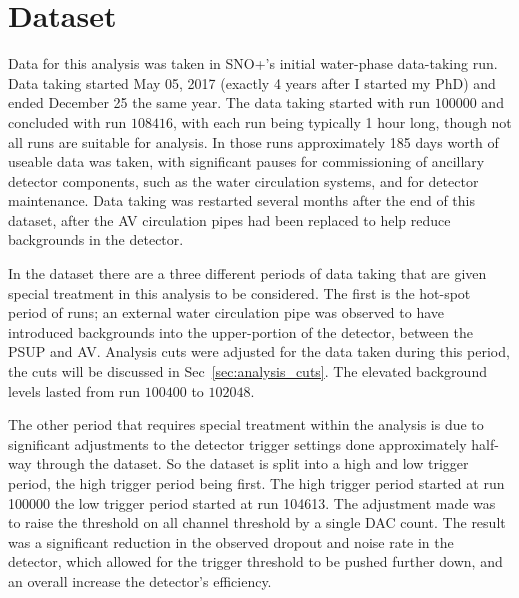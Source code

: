 \section{Dataset}
\label{sec:dataset}
Data for this analysis was taken in SNO+'s initial water-phase data-taking
run.
Data taking started May 05, 2017 (exactly 4 years after I
started my PhD) and ended December 25 the same year.
The data taking started with run $100000$ and concluded with run
$108416$, with each run being typically 1 hour long, though not
all runs are suitable for analysis.
In those runs approximately 185 days worth of useable data was taken,
with significant pauses for commissioning of ancillary detector components,
such as the water circulation systems, and for detector maintenance.
Data taking was restarted several months after the end of this dataset,
after the AV circulation pipes had been replaced to help reduce backgrounds
in the detector.

In the dataset there are a three different periods of data taking that are
given special treatment in this analysis
to be considered.
The first is the hot-spot period of runs;
an external water circulation pipe was observed to have
introduced backgrounds into the upper-portion of the detector, between the
PSUP and AV\@.
Analysis cuts were adjusted for the data taken during this period,
the cuts will be discussed in Sec~\ref{sec:analysis_cuts}.
The elevated background levels lasted from run $100400$ to $102048$.

The other period that requires special treatment within the analysis
is due to significant adjustments to the detector trigger settings done approximately
half-way through the dataset.
So the dataset is split into a high and low trigger period, the high trigger
period being first.
The high trigger period started at run 100000 the low trigger period started
at run 104613.
The adjustment made was to raise the threshold on all channel threshold
by a single DAC count.
The result was a significant reduction in the observed dropout and noise rate
in the detector, which allowed for the trigger threshold to be pushed further
down, and an overall increase the detector's efficiency.

